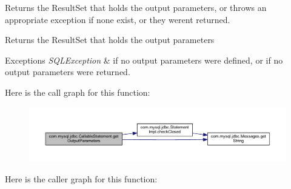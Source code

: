 Returns the Result\+Set that holds the output parameters, or throws an appropriate exception if none exist, or they weren\textquotesingle{}t returned.

\begin{DoxyReturn}{Returns}
the Result\+Set that holds the output parameters
\end{DoxyReturn}

\begin{DoxyExceptions}{Exceptions}
{\em S\+Q\+L\+Exception} & if no output parameters were defined, or if no output parameters were returned. \\
\hline
\end{DoxyExceptions}
Here is the call graph for this function\+:\nopagebreak
\begin{figure}[H]
\begin{center}
\leavevmode
\includegraphics[width=350pt]{classcom_1_1mysql_1_1jdbc_1_1_callable_statement_a1182e743ef39610d0aaa8cda05648433_cgraph}
\end{center}
\end{figure}
Here is the caller graph for this function\+:\nopagebreak
